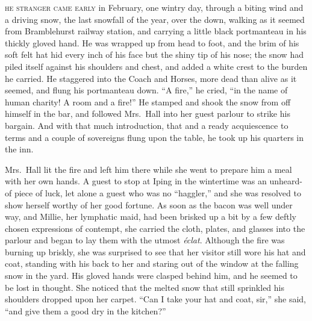 \label{ch:01}
\begin{ChapterStart}
\vspace*{2\nbs}

\vspace{1.5\nbs}
\vspace{0.75\nbs}
\end{ChapterStart}

\kern-3pt\textsc{he stranger came early} in February, one wintry day, through a biting wind and a driving snow, the last snowfall of the year, over the down, walking as it seemed from Bramblehurst railway station, and carrying a little black portmanteau in his thickly gloved hand. He was wrapped up from head to foot, and the brim of his soft felt hat hid every inch of his face but the shiny tip of his nose; the snow had piled itself against his shoulders and chest, and added a white crest to the burden he carried. He staggered into the Coach and Horses, more dead than alive as it seemed, and flung his portmanteau down. “A fire,” he cried, “in the name of human charity! A room and a fire!” He stamped and shook the snow from off himself in the bar, and followed Mrs.\ Hall into her guest parlour to strike his bargain. And with that much introduction, that and a ready acquiescence to terms and a couple of sovereigns flung upon the table, he took up his quarters in the inn.

Mrs.\ Hall lit the fire and left him there while she went to prepare him a meal with her own hands. A guest to stop at Iping in the wintertime was an unheard-of piece of luck, let alone a guest who was no “haggler,” and she was resolved to show herself worthy of her good fortune. As soon as the bacon was well under way, and Millie, her lymphatic maid, had been brisked up a bit by a few deftly chosen expressions of contempt, she carried the cloth, plates, and glasses into the parlour and began to lay them with the utmost \emph{éclat}. Although the fire was burning up briskly, she was surprised to see that her visitor still wore his hat and coat, standing with his back to her and staring out of the window at the falling snow in the yard. His gloved hands were clasped behind him, and he seemed to be lost in thought. She noticed that the melted snow that still sprinkled his shoulders dropped upon her carpet. “Can I take your hat and coat, sir,” she said, “and give them a good dry in the kitchen?”

